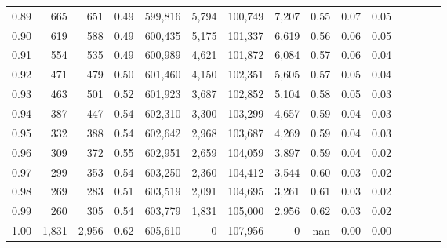 \begin{tabular}{rrrcrrrrrrrrrrr}
0.89 &     665 &    651 &                                       0.49 &  599,816 &    5,794 &  100,749 &    7,207 &  0.55 &  0.07 &                         0.05 \\
0.90 &     619 &    588 &                                       0.49 &  600,435 &    5,175 &  101,337 &    6,619 &  0.56 &  0.06 &                         0.05 \\
0.91 &     554 &    535 &                                       0.49 &  600,989 &    4,621 &  101,872 &    6,084 &  0.57 &  0.06 &                         0.04 \\
0.92 &     471 &    479 &                                       0.50 &  601,460 &    4,150 &  102,351 &    5,605 &  0.57 &  0.05 &                         0.04 \\
0.93 &     463 &    501 &                                       0.52 &  601,923 &    3,687 &  102,852 &    5,104 &  0.58 &  0.05 &                         0.03 \\
0.94 &     387 &    447 &                                       0.54 &  602,310 &    3,300 &  103,299 &    4,657 &  0.59 &  0.04 &                         0.03 \\
0.95 &     332 &    388 &                                       0.54 &  602,642 &    2,968 &  103,687 &    4,269 &  0.59 &  0.04 &                         0.03 \\
0.96 &     309 &    372 &                                       0.55 &  602,951 &    2,659 &  104,059 &    3,897 &  0.59 &  0.04 &                         0.02 \\
0.97 &     299 &    353 &                                       0.54 &  603,250 &    2,360 &  104,412 &    3,544 &  0.60 &  0.03 &                         0.02 \\
0.98 &     269 &    283 &                                       0.51 &  603,519 &    2,091 &  104,695 &    3,261 &  0.61 &  0.03 &                         0.02 \\
0.99 &     260 &    305 &                                       0.54 &  603,779 &    1,831 &  105,000 &    2,956 &  0.62 &  0.03 &                         0.02 \\
1.00 &   1,831 &  2,956 &                                       0.62 &  605,610 &        0 &  107,956 &        0 &   nan &  0.00 &                         0.00 \\
\bottomrule
\end{tabular}
